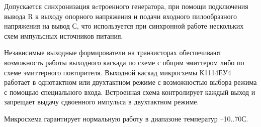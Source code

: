 Допускается синхронизация вcтроенного генератора, при помощи подключения вывода R к выходу опорного напряжения и подачи входного пилообразного напряжения на вывод С, что используется при синхронной работе нескольких схем импульсных источников питания.

Независимые выходные формирователи на транзисторах обеспечивают возможность работы выходного каскада по схеме с общим эмиттером либо по схеме эмиттерного повторителя. Выходной каскад микросхемы К1114ЕУ4 работает в однотактном или двухтактном режиме с возможностью выбора режима с помощью специального входа. Встроенная схема контролирует каждый выход и запрещает выдачу сдвоенного импульса в двухтактном режиме.

Микросхема гарантирует нормальную работу в диапазоне температур –10..70С.